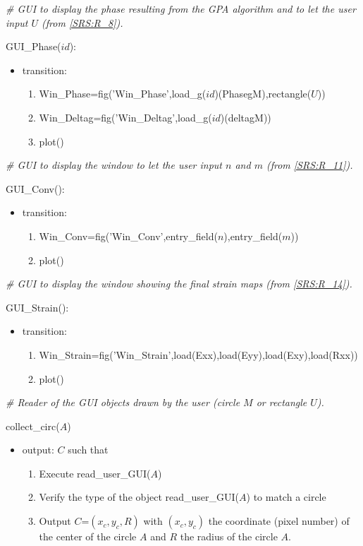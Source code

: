 \documentclass[12pt, titlepage]{article}
\begin{document}
\noindent\textit{{\#} GUI to display the phase resulting from the GPA algorithm 
and to let the user input $U$ (from \cref{SRS:R_8}).}\medskip

\noindent GUI{\_}Phase($id$):
\begin{itemize}
\item transition: 
	\begin{enumerate}
	\item Win{\_}Phase=fig('Win{\_}Phase',load{\_}g($id$)(PhasegM),rectangle($U$))
	\item Win{\_}Deltag=fig('Win{\_}Deltag',load{\_}g($id$)(deltagM))
	\item plot()
	\end{enumerate} 
\end{itemize}
\bigskip

\noindent\textit{{\#} GUI to display the window to let the user input $n$ and 
$m$ (from \cref{SRS:R_11}).}\medskip

\noindent GUI{\_}Conv():
\begin{itemize}
\item transition: 
	\begin{enumerate}
	\item Win{\_}Conv=fig('Win{\_}Conv',entry{\_}field($n$),entry{\_}field($m$))
	\item plot()
	\end{enumerate} 
\end{itemize}
\bigskip

\noindent\textit{{\#} GUI to display the window showing the final strain maps 
(from \cref{SRS:R_14}).}\medskip

\noindent GUI{\_}Strain():
\begin{itemize}
\item transition: 
	\begin{enumerate}
	\item 
Win{\_}Strain=fig('Win{\_}Strain',load(Exx),load(Eyy),load(Exy),load(Rxx))
	\item plot()
	\end{enumerate} 
\end{itemize}
\bigskip


\noindent\textit{{\#} Reader of the GUI objects drawn by the user (circle $M$ or 
rectangle $U$).} \medskip

\noindent collect{\_}circ($A$)
\begin{itemize}
\item output: $C$ such that
	\begin{enumerate}
	\item Execute read{\_}user{\_}GUI($A$)
	\item Verify the type of the object read{\_}user{\_}GUI($A$) to match a circle
	\item Output $C$=$(x_c,y_c,R)$ with $(x_c,y_c)$ the coordinate (pixel number) 
of the center of the circle $A$ and $R$ the radius of the circle $A$.
	\end{enumerate} 
\end{itemize}
\bigskip
\end{document}
